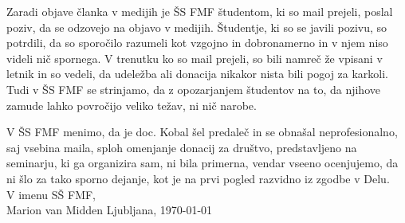 \documentclass[a4paper,oneside,12pt]{article}
\theoremstyle{definition}
\begin{document}
Zaradi objave članka v medijih je ŠS FMF študentom, ki so mail prejeli, poslal poziv, da se odzovejo na objavo v
medijih. Študentje, ki so se javili pozivu, so potrdili, da so sporočilo razumeli kot vzgojno in dobronamerno in v njem niso videli nič spornega. V trenutku ko so mail prejeli, so bili namreč že vpisani v letnik in so vedeli, da udeležba ali donacija nikakor nista bili pogoj za karkoli. Tudi v ŠS FMF se strinjamo, da z opozarjanjem študentov na to, da njihove zamude lahko povročijo veliko težav, ni nič narobe.

V ŠS FMF menimo, da je doc. Kobal šel predaleč in se obnašal neprofesionalno, saj vsebina maila, sploh omenjanje donacij za društvo, predstavljeno na seminarju, ki ga organizira sam, ni bila primerna, vendar vseeno ocenjujemo, da ni šlo za tako sporno dejanje, kot je na prvi pogled razvidno iz zgodbe v Delu. \\

\noindent V imenu SŠ FMF, \\
Marion van Midden \hfill Ljubljana, \today

\end{document}
